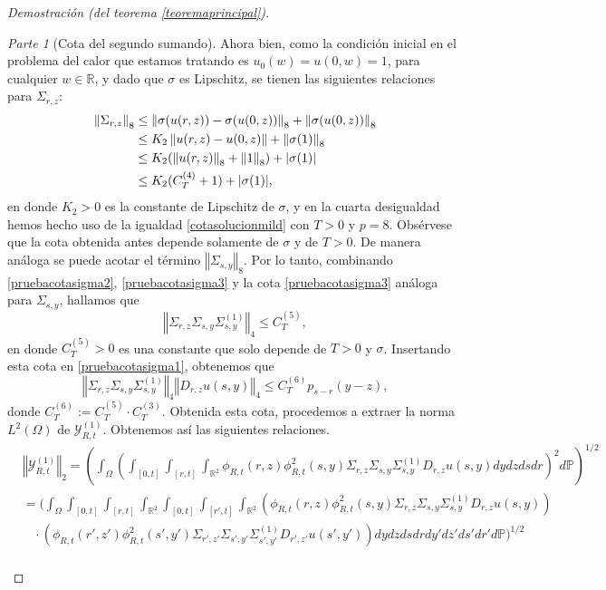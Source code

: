 \documentclass[letterpaper,twoside,12pt]{book}
\newcommand{\R}{\mathbb{R}}
\renewcommand{\P}{\mathbb{P}}
\newcommand{\1}{\mathds{1}}
\newcommand{\norm}[1]{\left\Vert #1 \right\Vert}
\theoremstyle{definition}
\theoremstyle{definition}
\theoremstyle{remark}
\newtheorem{proofpart}{Parte}
\theoremstyle{definition}
\theoremstyle{definition}
\theoremstyle{definition}
\theoremstyle{definition}
\theoremstyle{definition}
\begin{document}
\begin{proof}[Demostración (del teorema \ref{teoremaprincipal})]
\begin{proofpart}[Cota del segundo sumando]
Ahora bien, como la condición inicial en el problema del calor que estamos tratando es $u_0(w)=u(0,w)=1$, para cualquier $w\in \R$, y dado que $\sigma$ es Lipschitz,  se tienen las siguientes relaciones para $\Sigma_{r,z}$:
\begin{align}
      \norm{\Sigma_{r,z}}_8&\leq\norm{\sigma(u(r,z))-\sigma(u(0,z))}_8+\norm{\sigma(u(0,z))}_8\notag\\
      &\leq K_2\norm{u(r,z)-u(0,z)}+\norm{\sigma(1)}_8\notag\\
      &\leq K_2(\norm{u(r,z)}_8+\norm{1}_8)+|\sigma(1)|\notag\\
      &\leq K_2(C_{T}^{(4)}+1)+|\sigma(1)|\label{pruebacotasigma3},
\end{align}
en donde $K_2>0$ es la constante de Lipschitz de $\sigma$, y en la cuarta desigualdad hemos hecho uso de la igualdad \eqref{cotasolucionmild} con $T>0$ y $p=8$. Obsérvese que la cota obtenida antes depende solamente de $\sigma$ y de $T>0$. De manera análoga se puede acotar el término $\norm{\Sigma_{s,y}}_8$. Por lo tanto, combinando \eqref{pruebacotasigma2}, \eqref{pruebacotasigma3} y la cota \eqref{pruebacotasigma3} análoga para $\Sigma_{s,y}$, hallamos que 
\begin{equation}\label{pruebacotasigma4.5}
   \norm{\Sigma_{r,z}\Sigma_{s,y}\Sigma_{s,y}^{(1)}}_4\leq C_{T}^{(5)},
\end{equation} 
en donde $C^{(5)}_T>0$ es una constante que solo depende de $T>0$ y $\sigma$. Insertando esta cota en \eqref{pruebacotasigma1}, obtenemos que 
\begin{equation}\label{pruebacotasigma4}
   \norm{\Sigma_{r,z}\Sigma_{s,y}\Sigma_{s,y}^{(1)}}_4\norm{D_{r,z}u(s,y)}_4\leq C_{T}^{(6)}p_{s-r}(y-z),
\end{equation}
 donde $C_T^{(6)}:=C_T^{(5)}\cdot C_T^{(3)}$. Obtenida esta cota, procedemos a extraer la norma $L^{2}(\Omega)$ de $\mathcal{Y}_{R,t}^{(1)}$. Obtenemos así las siguientes relaciones.
 \begin{align*}
   &\norm{\mathcal{Y}_{R,t}^{(1)}}_2=\left(\int_\Omega \left(\int_{[0,t]}\int_{[r,t]}\int_{\R^2}\phi_{R,t}(r,z)\phi_{R,t}^2(s,y)\Sigma_{r,z}\Sigma_{s,y}\Sigma^{(1)}_{s,y}D_{r,z}u(s,y)dy dz ds dr\right)^2d\P\right)^{1/2}\\
   &=\Bigg(\int_\Omega\int_{[0,t]}\int_{[r,t]}\int_{\R^2}\int_{[0,t]}\int_{[r',t]}\int_{\R^2}\left(\phi_{R,t}(r,z)\phi_{R,t}^2(s,y)\Sigma_{r,z}\Sigma_{s,y}\Sigma^{(1)}_{s,y}D_{r,z}u(s,y)\right)\\
   &\ \ \ \ \cdot \left(\phi_{R,t}(r',z')\phi_{R,t}^2(s',y')\Sigma_{r',z'}\Sigma_{s',y'}\Sigma^{(1)}_{s',y'}D_{r',z'}u(s',y')\right)dy dz ds dr dy' dz'ds'dr'd\P\Bigg)^{1/2}\\

\end{align*}
\end{proofpart}
\end{proof}
\end{document}
